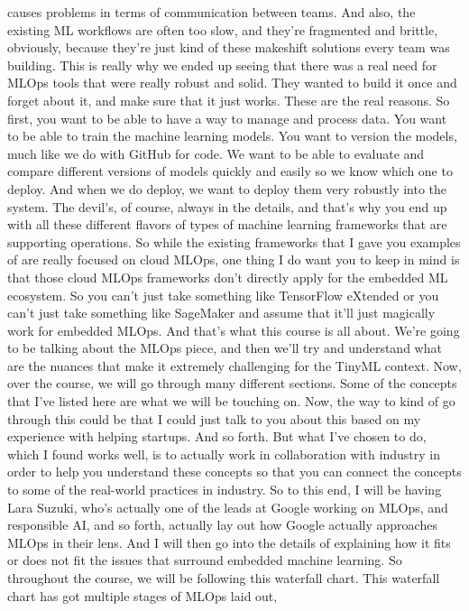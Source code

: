 causes problems in terms of communication between teams.
And also, the existing ML workflows are often too slow,
and they're fragmented and brittle, obviously,
because they're just kind of these makeshift solutions every team was
building.
This is really why we ended up seeing that there
was a real need for MLOps tools that were really robust and solid.
They wanted to build it once and forget about it,
and make sure that it just works.
These are the real reasons.
So first, you want to be able to have a way to manage and process data.
You want to be able to train the machine learning models.
You want to version the models, much like we do with GitHub for code.
We want to be able to evaluate and compare different versions of models
quickly and easily so we know which one to deploy.
And when we do deploy, we want to deploy them very robustly into the system.
The devil's, of course, always in the details,
and that's why you end up with all these different flavors of types of machine
learning frameworks that are supporting operations.
So while the existing frameworks that I gave you
examples of are really focused on cloud MLOps,
one thing I do want you to keep in mind is
that those cloud MLOps frameworks don't directly
apply for the embedded ML ecosystem.
So you can't just take something like TensorFlow eXtended or you can't just
take something like SageMaker and assume that it'll just magically
work for embedded MLOps.
And that's what this course is all about.
We're going to be talking about the MLOps piece,
and then we'll try and understand what are
the nuances that make it extremely challenging for the TinyML context.
Now, over the course, we will go through many different sections.
Some of the concepts that I've listed here are what we will be touching on.
Now, the way to kind of go through this could
be that I could just talk to you about this based on my experience
with helping startups.
And so forth.
But what I've chosen to do, which I found works well,
is to actually work in collaboration with industry
in order to help you understand these concepts so
that you can connect the concepts to some
of the real-world practices in industry.
So to this end, I will be having Lara Suzuki, who's actually
one of the leads at Google working on MLOps, and responsible AI,
and so forth, actually lay out how Google actually
approaches MLOps in their lens.
And I will then go into the details of explaining
how it fits or does not fit the issues that surround embedded machine
learning.
So throughout the course, we will be following this waterfall chart.
This waterfall chart has got multiple stages of MLOps laid out,
